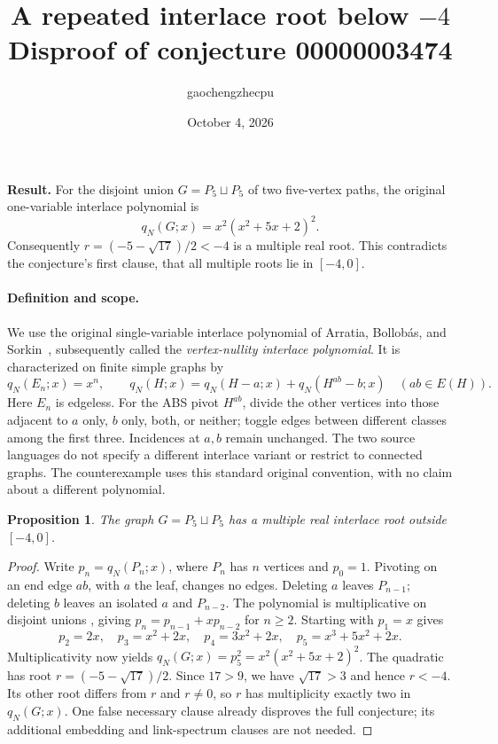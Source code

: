 \documentclass[11pt]{article}
\title{A repeated interlace root below $-4$\\\large Disproof of conjecture 00000003474}
\author{gaochengzhecpu}
\date{October 4, 2026}
\newtheorem{proposition}{Proposition}
\newcommand{\qN}{q_N}
\begin{document}
\maketitle
\noindent\textbf{Result.} For the disjoint union $G=P_5\sqcup P_5$ of two
five-vertex paths, the original one-variable interlace polynomial is
\[
 \qN(G;x)=x^2(x^2+5x+2)^2.
\]
Consequently $r=(-5-\sqrt{17})/2<-4$ is a multiple real root. This contradicts
the conjecture's first clause, that all multiple roots lie in $[-4,0]$.

\paragraph{Definition and scope.}
We use the original single-variable interlace polynomial of
Arratia, Bollob\'as, and Sorkin~\cite{ABS}, subsequently called the
\emph{vertex-nullity interlace polynomial}. It is characterized on finite
simple graphs by
\begin{equation}\label{eq:rec}
 \qN(E_n;x)=x^n,\qquad
 \qN(H;x)=\qN(H-a;x)+\qN(H^{ab}-b;x)\quad(ab\in E(H)).
\end{equation}
Here $E_n$ is edgeless. For the ABS pivot $H^{ab}$, divide the other vertices
into those adjacent to $a$ only, $b$ only, both, or neither; toggle edges
between different classes among the first three. Incidences at $a,b$ remain
unchanged. The two source languages do not specify a different interlace
variant or restrict to connected graphs. The counterexample uses this
standard original convention, with no claim about a different polynomial.

\begin{proposition}
The graph $G=P_5\sqcup P_5$ has a multiple real interlace root outside $[-4,0]$.
\end{proposition}
\begin{proof}
Write $p_n=\qN(P_n;x)$, where $P_n$ has $n$ vertices and $p_0=1$.
Pivoting on an end edge $ab$, with $a$ the leaf, changes no edges.
Deleting $a$ leaves $P_{n-1}$; deleting $b$ leaves an isolated $a$ and
$P_{n-2}$. The polynomial is multiplicative on disjoint unions
\cite[Remark 16]{ABS}, giving $p_n=p_{n-1}+xp_{n-2}$ for $n\ge2$.
Starting with $p_1=x$ gives
\[
 p_2=2x,\quad p_3=x^2+2x,\quad
 p_4=3x^2+2x,\quad p_5=x^3+5x^2+2x.
\]
Multiplicativity now yields $\qN(G;x)=p_5^2=x^2(x^2+5x+2)^2$.
The quadratic has root $r=(-5-\sqrt{17})/2$. Since $17>9$, we have
$\sqrt{17}>3$ and hence $r<-4$. Its other root differs from $r$ and
$r\ne0$, so $r$ has multiplicity exactly two in $\qN(G;x)$.
One false necessary clause already disproves the full conjecture; its
additional embedding and link-spectrum clauses are not needed.
\end{proof}
\end{document}
